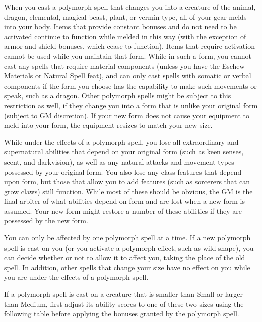 When you cast a polymorph spell that changes you into a creature of the animal, dragon, elemental, magical beast, plant, or vermin type, all of your gear melds into your body. Items that provide constant bonuses and do not need to be activated continue to function while melded in this way (with the exception of armor and shield bonuses, which cease to function). Items that require activation cannot be used while you maintain that form. While in such a form, you cannot cast any spells that require material components (unless you have the Eschew Materials or Natural Spell feat), and can only cast spells with somatic or verbal components if the form you choose has the capability to make such movements or speak, such as a dragon. Other polymorph spells might be subject to this restriction as well, if they change you into a form that is unlike your original form (subject to GM discretion). If your new form does not cause your equipment to meld into your form, the equipment resizes to match your new size. 
				
While under the effects of a polymorph spell, you lose all extraordinary and supernatural abilities that depend on your original form (such as keen senses, scent, and darkvision), as well as any natural attacks and movement types possessed by your original form. You also lose any class features that depend upon form, but those that allow you to add features (such as sorcerers that can grow claws) still function. While most of these should be obvious, the GM is the final arbiter of what abilities depend on form and are lost when a new form is assumed. Your new form might restore a number of these abilities if they are possessed by the new form.
				
You can only be affected by one polymorph spell at a time. If a new polymorph spell is cast on you (or you activate a polymorph effect, such as wild shape), you can decide whether or not to allow it to affect you, taking the place of the old spell. In addition, other spells that change your size have no effect on you while you are under the effects of a polymorph spell.
				
If a polymorph spell is cast on a creature that is smaller than Small or larger than Medium, first adjust its ability scores to one of these two sizes using the following table before applying the bonuses granted by the polymorph spell.

